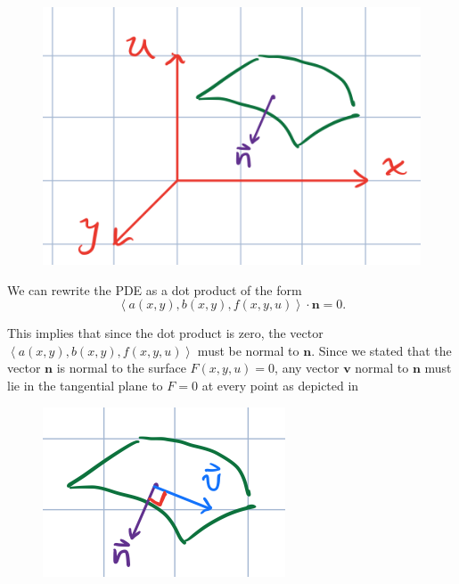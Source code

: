 \begin{figure}[h!]
	\centering \includegraphics[scale=.75]{fig/fig2_method_characteristics.png}
	\caption{}
	\label{fig_normal_vector}
\end{figure}

We can rewrite the PDE as a dot product of the form
\begin{equation}
  \left\langle a(x, y), b(x, y), f(x, y, u) \right\rangle \cdot \mathbf{n} = 0.
\end{equation}

This implies that since the dot product is zero, the vector $\left\langle a(x,
y), b(x, y), f(x, y, u) \right\rangle$ must be normal to $\mathbf{n}$. Since we
stated that the vector $\mathbf{n}$ is normal to the surface $F(x, y, u) = 0$,
any vector $\mathbf{v}$ normal to $\mathbf{n}$ must lie in the tangential plane
to $F = 0$ at every point as depicted in
\begin{figure}[h!]
	\centering \includegraphics[scale=.75]{fig/fig3_method_characteristics.png}
	\caption{}
	\label{fig_tangential_vector}
\end{figure}
